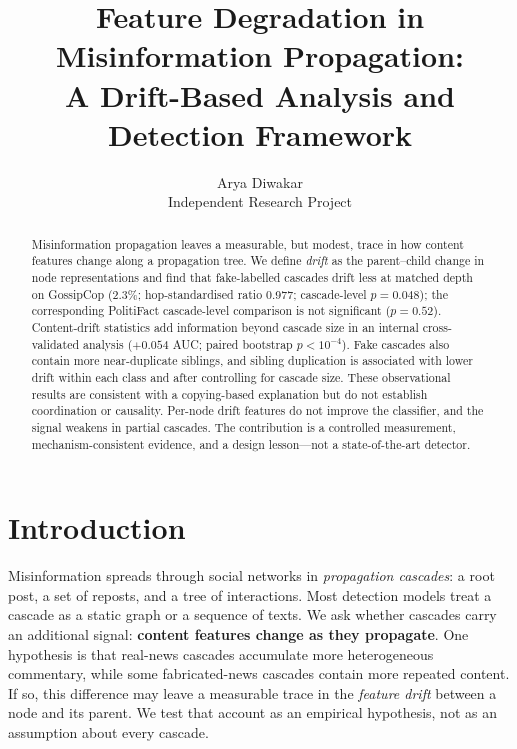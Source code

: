 \documentclass[10pt,twocolumn]{article}
\title{Feature Degradation in Misinformation Propagation:\\ A Drift-Based Analysis and Detection Framework}
\author{
  Arya Diwakar \\
  Independent Research Project
}
\date{}
\begin{document}
\maketitle

\begin{abstract}
Misinformation propagation leaves a measurable, but modest, trace in how
content features change along a propagation tree. We define \emph{drift} as
the parent--child change in node representations and find that fake-labelled
cascades drift less at matched depth on GossipCop (2.3\%; hop-standardised
ratio 0.977; cascade-level $p=0.048$); the corresponding PolitiFact
cascade-level comparison is not significant ($p=0.52$). Content-drift
statistics add information beyond cascade size in an internal cross-validated
analysis ($+0.054$ AUC; paired bootstrap $p<10^{-4}$). Fake cascades also
contain more near-duplicate siblings, and sibling duplication is associated
with lower drift within each class and after controlling for cascade size.
These observational results are consistent with a copying-based explanation
but do not establish coordination or causality. Per-node drift features do not
improve the classifier, and the signal weakens in partial cascades. The
contribution is a controlled measurement, mechanism-consistent evidence, and a
design lesson---not a state-of-the-art detector.
\end{abstract}

\section{Introduction}
\label{sec:intro}

Misinformation spreads through social networks in \emph{propagation cascades}: a
root post, a set of reposts, and a tree of interactions. Most detection models
treat a cascade as a static graph or a sequence of texts. We ask whether
cascades carry an additional signal: \textbf{content features change as they
propagate}. One hypothesis is that real-news cascades accumulate more
heterogeneous commentary, while some fabricated-news cascades contain more
repeated content. If so, this difference may leave a measurable trace in the
\emph{feature drift} between a node and its parent. We test that account as an
empirical hypothesis, not as an assumption about every cascade.
\end{document}
